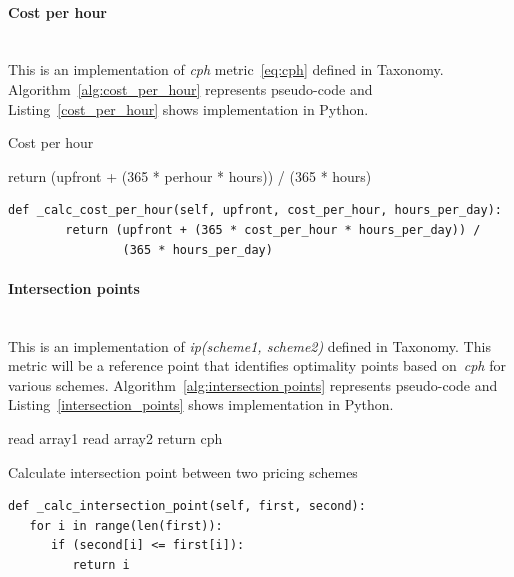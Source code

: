 \documentclass[]{final_report}
\newcommand{\myparagraph}[1]{\paragraph{#1}\mbox{}\\}
\begin{document}
\myparagraph{Cost per hour}

This is an implementation of \textit{cph} metric~\ref{eq:cph} defined in Taxonomy. Algorithm~\ref{alg:cost_per_hour} represents pseudo-code and Listing~\ref{cost_per_hour} shows implementation in Python.

\begin{algorithm}[H]
 \caption{Cost per hour}
 \label{alg:cost_per_hour}
 return (upfront + (365 * perhour * hours)) / (365 * hours)
\end{algorithm}

\begin{minipage}{\linewidth}
\begin{lstlisting}[label={cost_per_hour},caption={Uptime per machine implementation in Apache Spark},frame=single] 
def _calc_cost_per_hour(self, upfront, cost_per_hour, hours_per_day):
        return (upfront + (365 * cost_per_hour * hours_per_day)) /
                (365 * hours_per_day)
\end{lstlisting}
\end{minipage}

\myparagraph{Intersection points}

This is an implementation of \textit{ip(scheme1, scheme2)} defined in Taxonomy. This metric will be a reference point that identifies optimality points based on~\textit{cph} for various schemes. Algorithm~\ref{alg:intersection points} represents pseudo-code and Listing~\ref{intersection_points} shows implementation in Python. 

\begin{algorithm}[H]
 \label{alg:intersection points}
 read array1\;
 read array2\;
  {
 	 {
 		return cph
 	}
 }
\caption{Calculate intersection point between two pricing schemes}
\end{algorithm}

\begin{minipage}{\linewidth}
\begin{lstlisting}[label={intersection_points},caption={Intersection point between various pricing schemes},frame=single] 
def _calc_intersection_point(self, first, second):
   for i in range(len(first)):
      if (second[i] <= first[i]):
         return i
\end{lstlisting}
\end{minipage}
\end{document}
